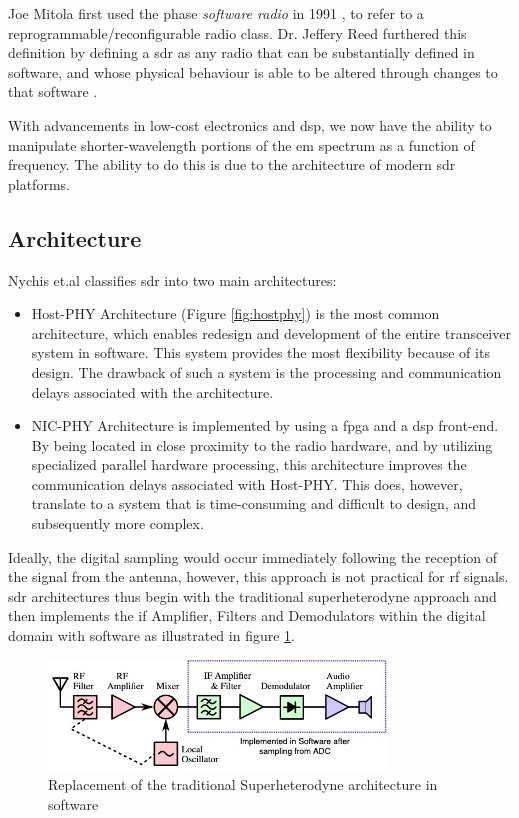 \documentclass[class=report,11pt,crop=false]{standalone}
\begin{document}
Joe Mitola first used the phase \emph{software radio} in 1991 \cite{sdr-modern-approach}, to refer to a reprogrammable/reconfigurable radio class. Dr. Jeffery Reed furthered this definition by defining a \gls{sdr} as any radio that can be substantially defined in software, and whose physical behaviour is able to be altered through changes to that software \cite{sdr-modern-approach}.

With advancements in low-cost electronics and \gls{dsp}, we now have the ability to manipulate shorter-wavelength portions of the \gls{em} spectrum as a function of frequency. The ability to do this is due to the architecture of modern \gls{sdr} platforms.

\subsection{Architecture}
Nychis et.al \cite{sdr-arch} classifies \gls{sdr} into two main architectures:
\begin{itemize}
    \item Host-PHY Architecture (Figure \ref{fig:hostphy}) is the most common architecture, which enables redesign and development of the entire transceiver system in software. This system provides the most flexibility because of its design. The drawback of such a system is the processing and communication delays associated with the architecture. 
    \item NIC-PHY Architecture is implemented by using a \gls{fpga} and a \gls{dsp} front-end. By being located in close proximity to the radio hardware, and by utilizing specialized parallel hardware processing, this architecture improves the communication delays associated with Host-PHY. This does, however, translate to a system that is time-consuming and difficult to design, and subsequently more complex. 
\end{itemize}

Ideally, the digital sampling would occur immediately following the reception of the signal from the antenna, however, this approach is not practical for \gls{rf} signals. \gls{sdr} architectures thus begin with the traditional superheterodyne approach and then implements the \gls{if} Amplifier, Filters and Demodulators within the digital domain with software as illustrated in figure \ref{fig:sdr-arch}.
\begin{figure}[h]
    \centering
    \includegraphics[width=0.8\textwidth]{Images/diagrams/superhet_software.jpg}
    \caption{Replacement of the traditional Superheterodyne architecture in software \cite{superhet}}
    \label{fig:sdr-arch}
\end{figure}
\end{document}
